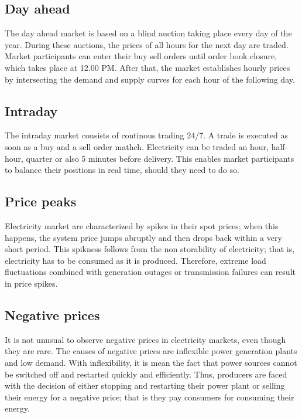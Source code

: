\subsection{Day ahead}
The day ahead market is based on a blind auction taking place every day of the year.
During these auctions, the prices of all hours for the next day are traded.
Market participants can enter their buy sell orders until order book closure, which takes place at 12.00 PM. After that, the market establishes hourly prices by intersecting the demand and supply curves for each hour of the following day.

\subsection{Intraday}
The intraday market consists of continous trading 24/7. A trade is executed as soon as a buy and a sell order mathch. Electricity can be traded an hour, half-hour, quarter or also 5 minutes before delivery. This enables market participants to balance their positions in real time, should they need to do so.

\subsection{Price peaks}
Electricity market are characterized by spikes in their spot prices; when this happens, the system price jumps abruptly and then drops back within a very short period.
This spikness follows from the non storability of electricity; that is, electricity has to be consumed as it is produced. Therefore, extreme load fluctuations combined with generation outages or transmission failures can result in price spikes.

\subsection{Negative prices}
It is not unusual to observe negative prices in electricity markets, even though they are rare.
The causes of negative prices are inflexible power generation plants and low demand. With inflexibility, it is mean the fact that power sources cannot be switched off and restarted quickly and efficiently.
Thus, producers are faced with the decision of either stopping and restarting their power plant or selling their energy for a negative price; that is they pay consumers for consuming their energy.

